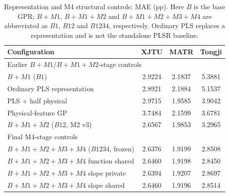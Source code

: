 \begin{table}[!htbp]
\centering
\caption{Representation and M4 structural controls: MAE (pp). Here $B$ is the base GPR; $B{+}M1$, $B{+}M1{+}M2$ and $B{+}M1{+}M2{+}M3{+}M4$ are abbreviated as $B1$, $B12$ and $B1234$, respectively. Ordinary PLS replaces a representation and is not the standalone PLSR baseline.}
\label{tab:controls}
\papertablesize
\renewcommand{\arraystretch}{1.15}
\setlength{\tabcolsep}{2.5pt}
%
\begin{tabular}{lccc}
\toprule
Configuration & XJTU & MATR & Tongji \\
\midrule
\multicolumn{4}{l}{Earlier $B{+}M1$/$B{+}M1{+}M2$-stage controls} \\
$B{+}M1$ ($B1$) & 2.9224 & 2.1837 & 5.3881 \\
Ordinary PLS representation & 2.8921 & 2.1884 & 5.1537 \\
PLS + half physical & 2.9715 & 1.9585 & 3.9042 \\
Physical-feature GP & 3.7484 & 2.1599 & 3.6781 \\
$B{+}M1{+}M2$ ($B12$, M2 v3) & 2.6567 & 1.9853 & 3.2965 \\
\midrule
\multicolumn{4}{l}{Final M4-stage controls} \\
$B{+}M1{+}M2{+}M3{+}M4$ ($B1234$, frozen) & 2.6376 & 1.9199 & 2.8508 \\
$B{+}M1{+}M2{+}M3{+}M4$ function shared & 2.6460 & 1.9198 & 2.8450 \\
$B{+}M1{+}M2{+}M3{+}M4$ slope private & 2.6394 & 1.9207 & 2.8697 \\
$B{+}M1{+}M2{+}M3{+}M4$ slope shared & 2.6460 & 1.9196 & 2.8514 \\
\bottomrule
\end{tabular}

\end{table}
